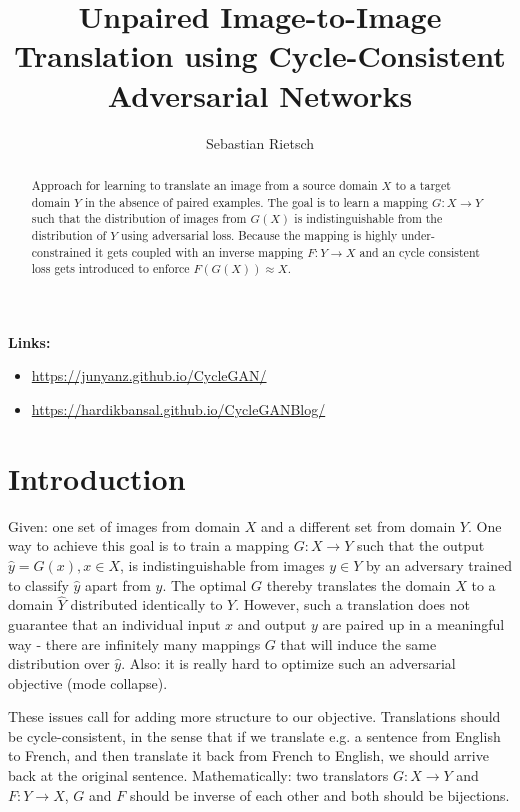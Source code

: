 \documentclass{scrartcl}
\begin{document}
\title{Unpaired Image-to-Image Translation
using Cycle-Consistent Adversarial Networks}
\author{Sebastian Rietsch}

\maketitle
\begin{abstract}
Approach for learning to translate an image from a source domain $X$ to a target domain $Y$ in the absence of paired examples. The goal is to learn a mapping $G: X \rightarrow Y$ such that the distribution of images from $G(X)$ is indistinguishable from the distribution of $Y$ using adversarial loss. Because the mapping is highly under-constrained it gets coupled with an inverse mapping $F: Y \rightarrow X$ and an cycle consistent loss gets introduced to enforce $F(G(X)) \approx X$.
\end{abstract}

\textbf{Links:}
\begin{itemize}
	\item
		\url{https://junyanz.github.io/CycleGAN/}
	\item
		\url{https://hardikbansal.github.io/CycleGANBlog/}
\end{itemize}

\section*{Introduction}
Given: one set of images from domain $X$ and a different set from domain $Y$. One way to achieve this goal is to train a mapping $G: X \rightarrow Y$ such that the output $\hat{y} = G(x), x \in X$, is indistinguishable from images $y \in Y$ by an adversary trained to classify $\hat{y}$ apart from $y$. The optimal $G$ thereby translates the domain $X$ to a domain $\hat{Y}$ distributed identically to $Y$. However, such a translation does not guarantee that an individual input $x$ and output $y$ are paired up in a meaningful way - there are infinitely many mappings $G$ that will induce the same distribution over $\hat{y}$. Also: it is really hard to optimize such an adversarial objective (mode collapse).

These issues call for adding more structure to our objective. Translations should be cycle-consistent, in the sense that if we translate e.g. a sentence from English to French, and then translate it back from French to English, we should arrive back at the original sentence. Mathematically: two translators $G: X \rightarrow Y$ and $F: Y \rightarrow X$, $G$ and $F$ should be inverse of each other and both should be bijections.
\end{document}
